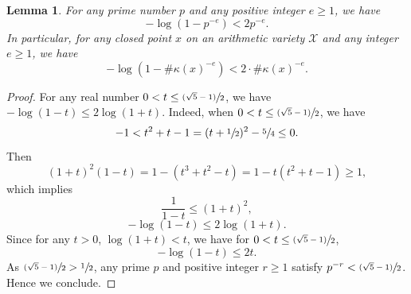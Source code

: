 \documentclass[JEP,XML,SOM,Unicode,published]{cedram}
\newcommand{\psfrac}[2]{\sfrac{(#1)}{#2}}
\theoremstyle{plain}
\newtheorem{lem}[thm]{Lemma}
\theoremstyle{definition}
\newcommand{\X}{\mathcal{X}}
\begin{document}
\begin{lem}\label{boundlog}
For any prime number $p$ and any positive integer $e\geq 1$, we have
\[
- \log(1-p^{-e})<2p^{-e}.
\]
In particular, for any closed point $x$ on an arithmetic variety $\X$ and any integer $e\geq 1$, we have
\[
- \log(1-\#\kappa(x)^{-e})<2\cdot\#\kappa(x)^{-e}.
\]
\end{lem}
\begin{proof}
For any real number $0<t\leq \psfrac{\sqrt{5}-1}{2}$, we have $-\log(1-t)\leq 2\log(1+t)$. Indeed, when $0<t\leq \psfrac{\sqrt{5}-1}{2}$, we have
\[
-1<t^2+t-1=(t+\sfrac{1}{2})^2-\sfrac{5}{4}\leq 0.
\]
Then
\[
(1+t)^2(1-t)=1-(t^3+t^2-t)=1-t(t^2+t-1)\geq 1,
\]
which implies
\[
\frac{1}{1-t}\leq (1+t)^2,
\]
\ie
\[
-\log(1-t)\leq 2\log(1+t).
\]
Since for any $t>0$, $\log(1+t)<t$, we have for $0<t\leq \psfrac{\sqrt{5}-1}{2}$,
\[
-\log(1-t)\leq 2t.
\]
As $\psfrac{\sqrt{5}-1}{2}>\sfrac{1}{2}$, any prime $p$ and positive integer $r\geq 1$ satisfy $p^{-r}< \psfrac{\sqrt{5}-1}{2}$. Hence we conclude.
\end{proof}
\end{document}
